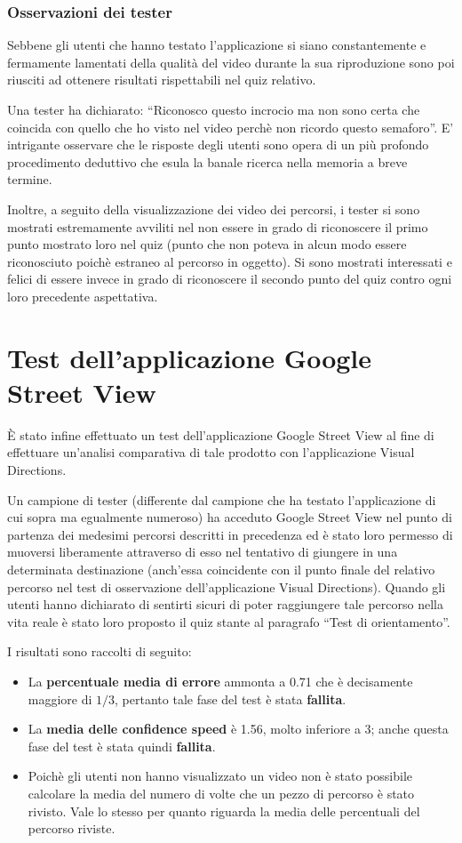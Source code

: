 \documentclass[12pt,a4paper,openright, notitlepage]{report}
\begin{document}
\subsubsection{Osservazioni dei tester}

Sebbene gli utenti che hanno testato l’applicazione si siano constantemente e fermamente lamentati della qualità del video durante la sua riproduzione sono poi riusciti ad ottenere risultati rispettabili nel quiz relativo. 

Una tester ha dichiarato: “Riconosco questo incrocio ma non sono certa che coincida con quello che ho visto nel video perchè non ricordo questo semaforo”. E’ intrigante osservare che le risposte degli utenti sono opera di un più profondo procedimento deduttivo che esula la banale ricerca nella memoria a breve termine. 

Inoltre, a seguito della visualizzazione dei video dei percorsi, i tester si sono mostrati estremamente avviliti nel non essere in grado di riconoscere il primo punto mostrato loro nel quiz (punto che non poteva in alcun modo essere riconosciuto poichè estraneo al percorso in oggetto). Si sono mostrati interessati e felici di essere invece in grado di riconoscere il secondo punto del quiz contro ogni loro precedente aspettativa.

\section{Test dell’applicazione Google Street View}

È stato infine effettuato un test dell’applicazione Google Street View al fine di effettuare un’analisi comparativa di tale prodotto con l’applicazione Visual Directions.

Un campione di tester (differente dal campione che ha testato l’applicazione di cui sopra ma egualmente numeroso) ha acceduto Google Street View nel punto di partenza dei medesimi percorsi descritti in precedenza ed è stato loro permesso di muoversi liberamente attraverso di esso nel tentativo di giungere in una determinata destinazione (anch’essa coincidente con il punto finale del relativo percorso nel test di osservazione dell’applicazione Visual Directions). Quando gli utenti hanno dichiarato di sentirti sicuri di poter raggiungere tale percorso nella vita reale è stato loro proposto il quiz stante al paragrafo “Test di orientamento”.

I risultati sono raccolti di seguito:

\begin{itemize}
	\item La \textbf{percentuale media di errore} ammonta a 0.71 che è decisamente maggiore di $1/3$, pertanto tale fase del test è stata \textbf{fallita}.
	\item La \textbf{media delle confidence speed} è 1.56, molto inferiore a 3; anche questa fase del test è stata quindi \textbf{fallita}.
	\item Poichè gli utenti non hanno visualizzato un video non è stato possibile calcolare la media del numero di volte che un pezzo di percorso è stato rivisto. Vale lo stesso per quanto riguarda la media delle percentuali del percorso riviste.
\end{itemize}
\end{document}
